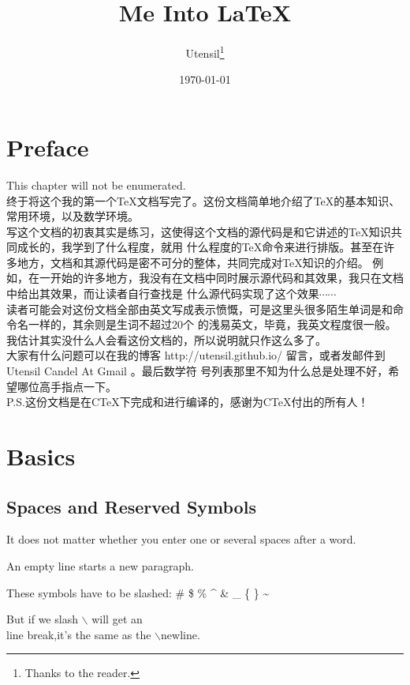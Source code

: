 \documentclass[a4paper]{report}
\title{Me Into \LaTeX}
\author{Utensil\thanks{Thanks to the reader.}}
\date{\today}
\begin{document}
\maketitle
\chapter*{Preface}
This chapter will not be enumerated. \\

终于将这个我的第一个\TeX{}文档写完了。这份文档简单地介绍了\TeX{}的基本知识、常用环境，以及数学环境。\\

写这个文档的初衷其实是练习，这使得这个文档的源代码是和它讲述的\TeX{}知识共同成长的，我学到了什么程度，就用
什么程度的\TeX{}命令来进行排版。甚至在许多地方，文档和其源代码是密不可分的整体，共同完成对\TeX{}知识的介绍。
例如，在一开始的许多地方，我没有在文档中同时展示源代码和其效果，我只在文档中给出其效果，而让读者自行查找是
什么源代码实现了这个效果$\cdots\cdots$\\

读者可能会对这份文档全部由英文写成表示愤慨，可是这里头很多陌生单词是和命令名一样的，其余则是生词不超过20个
的浅易英文，毕竟，我英文程度很一般。\\

我估计其实没什么人会看这份文档的，所以说明就只作这么多了。\\

大家有什么问题可以在我的博客 http://utensil.github.io/ 留言，或者发邮件到 Utensil Candel At Gmail 。最后数学符
号列表那里不知为什么总是处理不好，希望哪位高手指点一下。\\

P.S.这份文档是在C\TeX{}下完成和进行编译的，感谢为C\TeX{}付出的所有人！
\tableofcontents
\chapter{Basics}
\section{Spaces and Reserved Symbols}

It does not matter whether you enter one or several spaces after a
word.

An empty line starts a new paragraph.

These symbols have to be slashed: \# \$ \% \^{} \& \_ \{ \} \~{}

But if we slash $\backslash$ will get an \\ line break,it's the same
as the
\newline $\backslash$newline.
\end{document}
